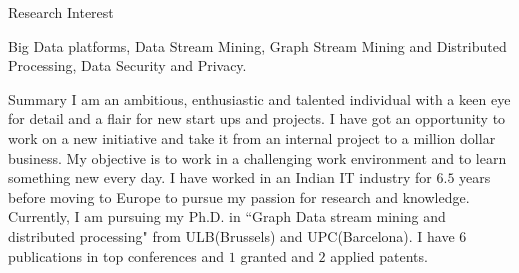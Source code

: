 \documentclass{resume} %
\begin{document}
\begin{rSection}{Research Interest}

Big Data platforms, Data Stream Mining, Graph Stream Mining and Distributed Processing, Data Security and Privacy.

\end{rSection}
\begin{rSection}{Summary}
I am an ambitious, enthusiastic and talented individual with a keen eye for detail and a flair for new start ups and projects. I have got an opportunity to work on a new initiative and take it from an internal project to a million dollar business. My objective is to work in a challenging work environment and to learn something new every day. I have worked in an Indian IT industry for $6.5$ years before moving to Europe to pursue my passion for research and knowledge. Currently, I am pursuing my Ph.D. in ``Graph Data stream mining and distributed processing" from ULB(Brussels) and UPC(Barcelona). I have $6$ publications in top conferences and $1$ granted and $2$ applied patents.
\end{rSection}




\end{document}
